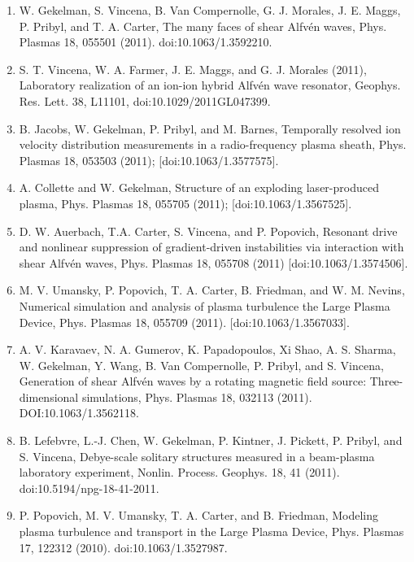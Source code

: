 \documentclass[11pt]{article}
\begin{document}
\begin{enumerate}
\item  W. Gekelman, S. Vincena, B. Van Compernolle, G. J. Morales, J. E. Maggs, P. Pribyl,  and T. A. Carter, The many faces of shear Alfv\'{e}n waves, Phys. Plasmas 18, 055501 (2011). doi:10.1063/1.3592210.

\item   S. T. Vincena,  W. A. Farmer, J. E. Maggs, and G. J. Morales (2011), Laboratory realization of an ion-ion hybrid Alfv\'{e}n wave resonator, Geophys. Res. Lett. 38, L11101, doi:10.1029/2011GL047399.

\item  B. Jacobs, W. Gekelman, P. Pribyl, and M. Barnes, Temporally resolved ion velocity distribution measurements in a radio-frequency plasma sheath, Phys. Plasmas 18, 053503 (2011); [doi:10.1063/1.3577575].

\item  A. Collette and W. Gekelman, Structure of an exploding laser-produced plasma, Phys. Plasmas 18, 055705 (2011); [doi:10.1063/1.3567525].

\item   D. W. Auerbach, T.A. Carter, S. Vincena, and P. Popovich, Resonant drive and nonlinear suppression of gradient-driven instabilities via interaction with shear Alfv\'{e}n waves, Phys. Plasmas 18, 055708 (2011) [doi:10.1063/1.3574506].

\item M. V. Umansky, P. Popovich, T. A. Carter, B. Friedman, and W. M. Nevins, Numerical simulation and analysis of plasma turbulence the Large Plasma Device, Phys. Plasmas 18, 055709 (2011). [doi:10.1063/1.3567033].

\item  A. V. Karavaev, N. A. Gumerov, K. Papadopoulos, Xi Shao, A. S. Sharma, W. Gekelman, Y. Wang, B. Van Compernolle, P. Pribyl, and S. Vincena, Generation of shear Alfv\'{e}n waves by a rotating magnetic field source: Three-dimensional simulations, Phys. Plasmas 18, 032113 (2011). DOI:10.1063/1.3562118.

\item  B. Lefebvre, L.-J. Chen, W. Gekelman, P. Kintner, J. Pickett, P. Pribyl, and S. Vincena, Debye-scale solitary structures measured in a beam-plasma laboratory experiment, Nonlin. Process. Geophys. 18, 41 (2011). doi:10.5194/npg-18-41-2011.

\item   P. Popovich, M. V. Umansky, T. A. Carter, and B. Friedman, Modeling plasma turbulence and transport in the Large Plasma Device, Phys. Plasmas 17, 122312  (2010). doi:10.1063/1.3527987.


\end{enumerate}
\end{document}
